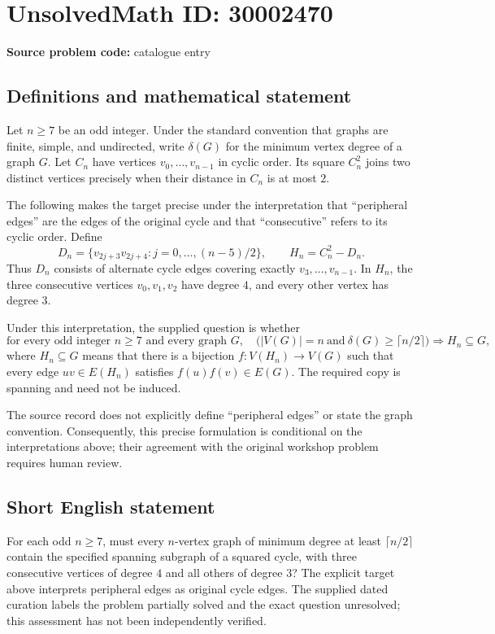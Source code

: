 \documentclass[11pt]{article}
\begin{document}
\section*{UnsolvedMath ID: 30002470}
\textbf{Source problem code:} catalogue entry
\subsection{Definitions and mathematical statement}
Let \(n\geq 7\) be an odd integer. Under the standard convention that graphs are finite, simple, and undirected, write \(\delta(G)\) for the minimum vertex degree of a graph \(G\). Let \(C_n\) have vertices \(v_0,\ldots,v_{n-1}\) in cyclic order. Its square \(C_n^2\) joins two distinct vertices precisely when their distance in \(C_n\) is at most \(2\).

The following makes the target precise under the interpretation that ``peripheral edges'' are the edges of the original cycle and that ``consecutive'' refers to its cyclic order. Define
\[
D_n=\{v_{2j+3}v_{2j+4}:j=0,\ldots,(n-5)/2\},
\qquad H_n=C_n^2-D_n.
\]
Thus \(D_n\) consists of alternate cycle edges covering exactly \(v_3,\ldots,v_{n-1}\). In \(H_n\), the three consecutive vertices \(v_0,v_1,v_2\) have degree \(4\), and every other vertex has degree \(3\).

Under this interpretation, the supplied question is whether
\[
\text{for every odd integer }n\geq7\text{ and every graph }G,\quad
\bigl(|V(G)|=n\ \text{and}\ \delta(G)\geq\lceil n/2\rceil\bigr)
\Longrightarrow H_n\subseteq G,
\]
where \(H_n\subseteq G\) means that there is a bijection \(f:V(H_n)\to V(G)\) such that every edge \(uv\in E(H_n)\) satisfies \(f(u)f(v)\in E(G)\). The required copy is spanning and need not be induced.

The source record does not explicitly define ``peripheral edges'' or state the graph convention. Consequently, this precise formulation is conditional on the interpretations above; their agreement with the original workshop problem requires human review.
\subsection{Short English statement}
For each odd \(n\geq7\), must every \(n\)-vertex graph of minimum degree at least \(\lceil n/2\rceil\) contain the specified spanning subgraph of a squared cycle, with three consecutive vertices of degree \(4\) and all others of degree \(3\)? The explicit target above interprets peripheral edges as original cycle edges. The supplied dated curation labels the problem partially solved and the exact question unresolved; this assessment has not been independently verified.
\end{document}
